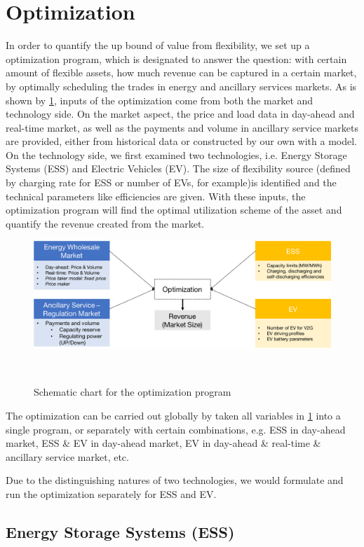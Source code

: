 \section{Optimization}
In order to quantify the up bound of value from flexibility, we set up a optimization program, which is designated to answer the question: with certain amount of flexible assets, how much revenue can be captured in a certain market, by optimally scheduling the trades in energy and ancillary services markets.  As is shown by \ref{fig:optimization}, inputs of the optimization come from both the market and technology side. On the market aspect, the price and load data in day-ahead and real-time market, as well as the payments and volume in ancillary service markets are provided, either from historical data or constructed by our own with a model. On the technology side, we first examined two technologies, i.e. Energy Storage Systems (ESS) and Electric Vehicles (EV). The size of flexibility source (defined by charging rate for ESS or number of EVs, for example)is identified and the technical parameters like efficiencies are given. With these inputs, the optimization program will find the optimal utilization scheme of the asset and quantify the revenue created from the market.

 \begin{figure}[h!]
 	\label{fig:optimization}
 	\includegraphics[scale=0.4]{Optimization}
 	\caption{Schematic chart for the optimization program}\
 \end{figure}

The optimization can be carried out globally by taken all variables in \ref{fig:optimization} into a single program, or separately with certain combinations, e.g. ESS in day-ahead market, ESS \& EV in day-ahead market, EV in day-ahead \& real-time \& ancillary service market, etc.

Due to the distinguishing natures of two technologies, we would formulate and run the optimization separately for ESS and EV.  

\subsection{Energy Storage Systems (ESS)} \label{sec:opt-ESS}

